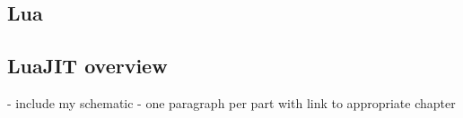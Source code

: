 


\subsection{Lua}
\label{Subsec:Lua}



\subsection{LuaJIT overview}
\label{Subsec:LuaJIT-overview}

- include my schematic
- one paragraph per part with link to appropriate chapter
